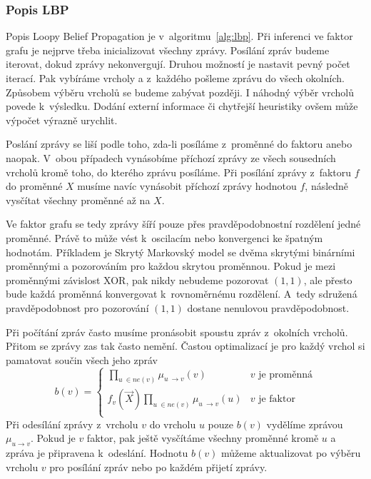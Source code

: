 \subsubsection{Popis LBP}

Popis Loopy Belief Propagation je v~algoritmu~\ref{alg:lbp}.
Při inferenci ve faktor grafu je nejprve třeba inicializovat všechny zprávy.
Posílání zpráv budeme iterovat, dokud zprávy nekonvergují.
Druhou možností je nastavit pevný počet iterací.
Pak vybíráme vrcholy a z~každého pošleme zprávu do všech okolních.
Způsobem výběru vrcholů se budeme zabývat později.
I náhodný výběr vrcholů povede k~výsledku.
Dodání externí informace či chytřejší heuristiky ovšem může výpočet výrazně urychlit.

Poslání zprávy se liší podle toho, zda-li posíláme z~proměnné do faktoru anebo naopak.
V~obou případech vynásobíme příchozí zprávy ze všech sousedních vrcholů kromě toho, do kterého zprávu posíláme.
Při posílání zprávy z~faktoru $f$ do proměnné $X$ musíme navíc vynásobit příchozí zprávy hodnotou $f$, následně vysčítat všechny proměnné až na $X$.

Ve faktor grafu se tedy zprávy šíří pouze přes pravděpodobnostní rozdělení jedné proměnné.
Právě to může vést k~oscilacím nebo konvergenci ke špatným hodnotám. 
Příkladem je Skrytý Markovský model se dvěma skrytými binárními proměnnými a pozorováním pro každou skrytou proměnnou.
Pokud je mezi proměnnými závislost XOR, pak nikdy nebudeme pozorovat $(1, 1)$, ale přesto bude každá proměnná konvergovat k~rovnoměrnému rozdělení. A~tedy sdružená pravděpodobnost pro pozorování $(1, 1)$ dostane nenulovou pravděpodobnost.

Při počítání zpráv často musíme pronásobit spoustu zpráv z~okolních vrcholů.
Přitom se zprávy zas tak často nemění.
Častou optimalizací je pro každý vrchol si pamatovat součin všech jeho zpráv
\begin{equation}
    b(v) = \begin{cases}
        \prod_{u~\in ne(v)} \mu_{u~\rightarrow v}(v) & \mbox{$v$ je proměnná} \\
        f_v(\vec{X}) \prod_{u~\in ne(v)} \mu_{u~\rightarrow v}(u) & \mbox{$v$ je faktor} \\
    \end{cases}
\end{equation}
Při odesílání zprávy z~vrcholu $v$ do vrcholu $u$ pouze $b(v)$ vydělíme zprávou $\mu_{u \rightarrow v}$.
Pokud je $v$ faktor, pak ještě vysčítáme všechny proměnné kromě $u$ a zpráva je připravena k~odeslání.
Hodnotu $b(v)$ můžeme aktualizovat po výběru vrcholu $v$ pro posílání zpráv nebo po každém přijetí zprávy.

